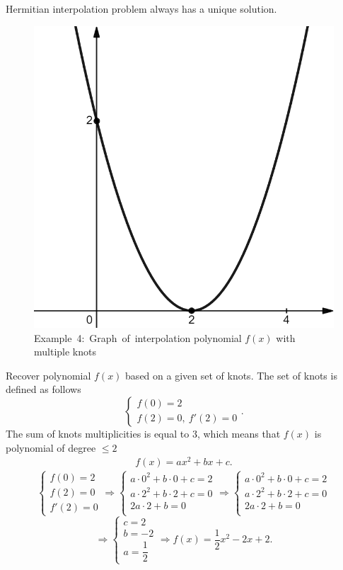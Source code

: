 \begin{proposition}{}{}
    Hermitian interpolation problem always has a unique solution.
\end{proposition}
\begin{figure}
    \includegraphics[height=0.3\columnwidth, width=0.32\columnwidth]{./lectures/images/interpolation_with_multiple_knots.png}
    \caption*{Example~4:~Graph~of~interpolation polynomial
    $f(x)$ with multiple knots}
\end{figure}
\Ex 
Recover polynomial $f(x)$ based on a given set of knots. The set of knots is defined as follows
$$
\left\{ 
\begin{array}{l}         
    f(0) = 2\\
    f(2) = 0, \ f'(2)=0
\end{array}
\right..
$$
The sum of knots multiplicities is equal to 3, which means that $f(x)$ is polynomial of degree $\leq 2$
\[
    \begin{array}{c}
        f(x) = ax^2 + bx + c.
    \end{array}  
\]
$$
\left\{ 
\begin{array}{l}         
    f(0) = 2\\
    f(2) = 0\\ 
    f'(2)=0
\end{array}
\right.
\Rightarrow
\left\{ 
\begin{array}{l}         
    a \cdot 0^2 + b\cdot0 + c = 2\\
    a \cdot 2^2 + b\cdot2 + c = 0\\
    2a \cdot 2 + b = 0\\
\end{array}
\right.
\Rightarrow
\left\{ 
\begin{array}{l}         
    a \cdot 0^2 + b\cdot0 + c = 2\\
    a \cdot 2^2 + b\cdot2 + c = 0\\
    2a \cdot 2 + b = 0\\
\end{array}
\right.
$$
$$
\Rightarrow
\left\{ 
\begin{array}{l}         
    c = 2\\
    b = -2\\ 
    a = \dfrac{1}{2}
\end{array}
\right.
\Longrightarrow f(x) = \dfrac{1}{2}x^2 - 2x + 2.
$$
\newpage
